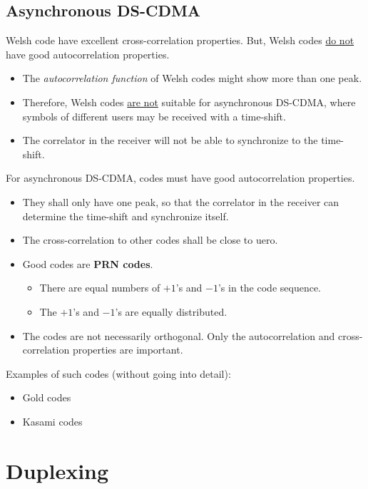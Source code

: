 \begin{refsection}
\subsection{Asynchronous \acs{DS-CDMA}}

Welsh code have excellent cross-correlation properties. But, Welsh codes \underline{do not} have good autocorrelation properties.
\begin{itemize}
	\item The \emph{autocorrelation function} of Welsh codes might show more than one peak.
	\item Therefore, Welsh codes \underline{are not} suitable for asynchronous \ac{DS-CDMA}, where symbols of different users may be received with a time-shift.
	\item The correlator in the receiver will not be able to synchronize to the time-shift.
\end{itemize}

For asynchronous \ac{DS-CDMA}, codes must have good autocorrelation properties.
\begin{itemize}
	\item They shall only have one peak, so that the correlator in the receiver can determine the time-shift and synchronize itself.
	\item The cross-correlation to other codes shall be close to uero.
	\item Good codes are  \textbf{\acf{PRN} codes}.
	\begin{itemize}
		\item There are equal numbers of $+1$'s and $-1$'s in the code sequence.
		\item The $+1$'s and $-1$'s are equally distributed.
	\end{itemize}
	\item The codes are not necessarily orthogonal. Only the autocorrelation and cross-correlation properties are important.
\end{itemize}

Examples of such codes (without going into detail):
\begin{itemize}
	\item Gold codes
	\item Kasami codes
\end{itemize}


\section{Duplexing}


\end{refsection}
